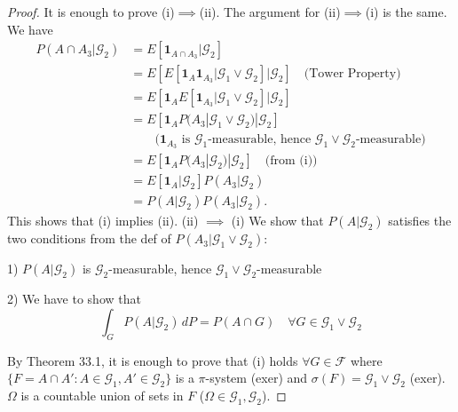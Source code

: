 \begin{proof}
It is enough to prove (i)$\implies$(ii). The argument for (ii)$\implies$(i) is the same. We have
\begin{align*}
P(A \cap A_3 | \mathcal{G}_2) &= E\left[\mathbf{1}_{A \cap A_3} | \mathcal{G}_2\right] \\
&= E\left[E\left[\mathbf{1}_{A} \mathbf{1}_{A_3} | \mathcal{G}_1 \vee \mathcal{G}_2\right] | \mathcal{G}_2\right] \quad \text{(Tower Property)} \\
&= E\left[\mathbf{1}_A E\left[\mathbf{1}_{A_3} | \mathcal{G}_1 \vee \mathcal{G}_2\right] | \mathcal{G}_2\right] \\
&= E\left[\mathbf{1}_A P(A_3 | \mathcal{G}_1 \vee \mathcal{G}_2) | \mathcal{G}_2\right] \\
&\quad \quad \text{($\mathbf{1}_{A_3}$ is $\mathcal{G}_1$-measurable, hence $\mathcal{G}_1 \vee \mathcal{G}_2$-measurable)} \\
&= E\left[\mathbf{1}_A P(A_3 | \mathcal{G}_2) | \mathcal{G}_2\right] \quad \text{(from (i))} \\
&= E\left[\mathbf{1}_A | \mathcal{G}_2\right] P(A_3 | \mathcal{G}_2) \\
&= P(A | \mathcal{G}_2) P(A_3 | \mathcal{G}_2).
\end{align*}
This shows that (i) implies (ii).
(ii) $\implies$ (i) We show that $P(A | \mathcal{G}_2)$ satisfies the two conditions from the def of $P(A_3 | \mathcal{G}_1 \vee \mathcal{G}_2)$:

1) $P(A | \mathcal{G}_2)$ is $\mathcal{G}_2$-measurable, hence $\mathcal{G}_1 \vee \mathcal{G}_2$-measurable

2) We have to show that
\[
\int_{G} P(A | \mathcal{G}_2) \, dP = P(A \cap G) \quad \forall G \in \mathcal{G}_1 \vee \mathcal{G}_2
\]

By Theorem 33.1, it is enough to prove that (i) holds $\forall G \in \mathcal{F}$ where $\{F = A \cap A' : A \in \mathcal{G}_1, A' \in \mathcal{G}_2\}$ is a $\pi$-system (exer) and $\sigma(F) = \mathcal{G}_1 \vee \mathcal{G}_2$ (exer). $\Omega$ is a countable union of sets in $F$ ($\Omega \in \mathcal{G}_1, \mathcal{G}_2$).


\end{proof}
